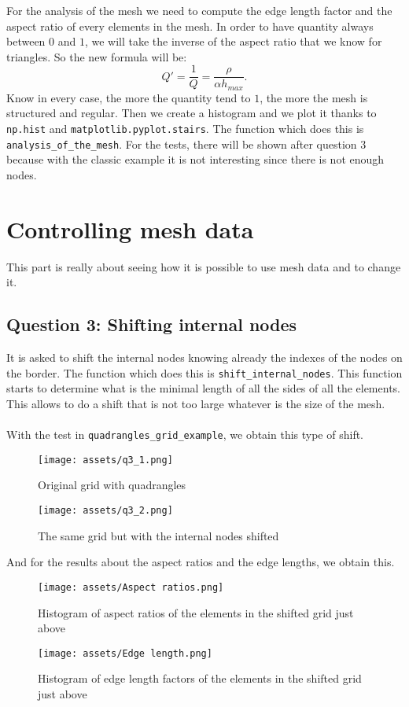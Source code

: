 \documentclass[a4paper]{article}
\begin{document}
\hspace{0.8cm} For the analysis of the mesh we need to compute the edge length factor and the aspect ratio of every elements in the mesh. In order to have quantity always between $0$ and $1$, we will take the inverse of the aspect ratio that we know for triangles. So the new formula will be: $$Q' = \displaystyle \frac{1}{Q} = \frac{\rho}{\alpha h_{max}}.$$
Know in every case, the more the quantity tend to $1$, the more the mesh is structured and regular. Then we create a histogram and we plot it thanks to \texttt{np.hist} and \texttt{matplotlib.pyplot.stairs}. The function which does this is \texttt{analysis\_of\_the\_mesh}. For the tests, there will be shown after question 3 because with the classic example it is not interesting since there is not enough nodes.

\section{Controlling mesh data}

This part is really about seeing how it is possible to use mesh data and to change it.

\subsection{Question 3: Shifting internal nodes}

It is asked to shift the internal nodes knowing already the indexes of the nodes on the border. The function which does this is \texttt{shift\_internal\_nodes}. This function starts to determine what is the minimal length of all the sides of all the elements. This allows to do a shift that is not too large whatever is the size of the mesh.\\ \\
With the test in \texttt{quadrangles\_grid\_example}, we obtain this type of shift.
\begin{figure}[H]
    \centering
    \texttt{[image: assets/q3\_1.png]}
    \caption{Original grid with quadrangles}
    \label{fig:plot_classic_example}
\end{figure}
\begin{figure}[H]
    \centering
    \texttt{[image: assets/q3\_2.png]}
    \caption{The same grid but with the internal nodes shifted}
    \label{fig:plot_classic_example}
\end{figure}
\noindent And for the results about the aspect ratios and the edge lengths, we obtain this.
\begin{figure}[H]
    \centering
    \texttt{[image: assets/Aspect ratios.png]}
    \caption{Histogram of aspect ratios of the elements in the shifted grid just above}
    \label{fig:plot_classic_example}
\end{figure}
\begin{figure}[H]
    \centering
    \texttt{[image: assets/Edge length.png]}
    \caption{Histogram of edge length factors of the elements in the shifted grid just above}
    \label{fig:plot_classic_example}
\end{figure}
\end{document}
